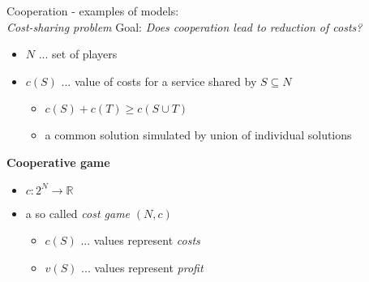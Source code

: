 \documentclass{beamer}
\begin{document}


\begin{frame}{Cooperation - examples of models:\\ \textit{Cost-sharing problem}}
    Goal: \textit{Does cooperation lead to reduction of costs?}
    \begin{itemize}
        \item $N$ ... set of players
        \item $c(S)$ ... value of costs for a service shared by $S \subseteq N$
        \begin{itemize}
            \item $c(S) + c(T) \geq c(S \cup T)$
            \item \small{a common solution simulated by union of individual solutions}
        \end{itemize}
    \end{itemize}
    \pause
    \textbf{Cooperative game}
    \begin{itemize}
        \item<3-> $c\colon 2 ^N \to \mathbb{R}$
        \item<3-> a so called \textit{cost game} $(N,c)$
        \begin{itemize}
            \item<4-> $c(S)$ ... values represent \textit{costs}
            \item<4-> $v(S)$ ... values represent \textit{profit}
        \end{itemize}
    \end{itemize}
\end{frame}





\end{document}
